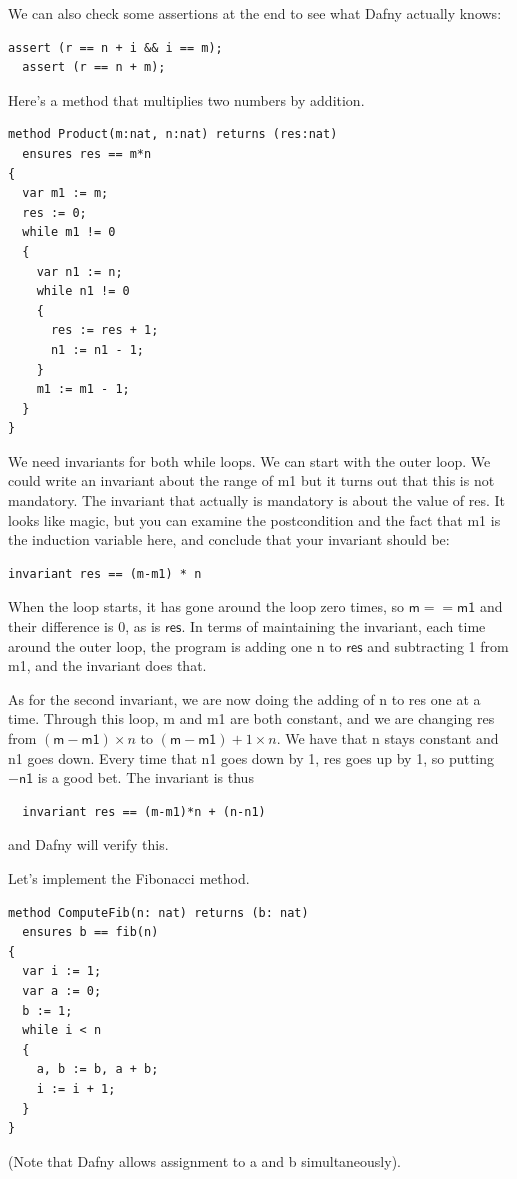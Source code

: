 \documentclass[11pt]{article}
\begin{document}
We can also check some assertions at the end to see what Dafny actually knows:
\begin{lstlisting}[language=dafny]
  assert (r == n + i && i == m);
  assert (r == n + m);
\end{lstlisting}

Here's a method that multiplies two numbers by addition.
\begin{lstlisting}[language=dafny]
method Product(m:nat, n:nat) returns (res:nat)
  ensures res == m*n
{
  var m1 := m;
  res := 0;
  while m1 != 0
  {
    var n1 := n;
    while n1 != 0
    {
      res := res + 1;
      n1 := n1 - 1;
    }
    m1 := m1 - 1;
  }
}
\end{lstlisting}
We need invariants for both \textsf{while} loops. We can start with the outer loop.
We could write an invariant about the range of \textsf{m1} but it turns out that this is not
mandatory. The invariant that actually is mandatory is about the value of \textsf{res}.
It looks like magic, but you can examine the postcondition and the fact that \textsf{m1}
is the induction variable here, and conclude that your invariant should be:
\begin{lstlisting}[language=dafny]
  invariant res == (m-m1) * n
\end{lstlisting}
When the loop starts, it has gone around the loop zero times, so
$\mathsf{m} == \mathsf{m1}$ and their difference is 0, as is
$\mathsf{res}$.  In terms of maintaining the invariant, each time around
the outer loop, the program is adding one \textsf{n} to $\mathsf{res}$
and subtracting 1 from \textsf{m1}, and the invariant does that.

As for the second invariant, we are now doing the adding of \textsf{n} to \textsf{res} one at a time.
Through this loop, \textsf{m} and \textsf{m1} are both constant, and we are changing \textsf{res}
from $(\mathsf{m}-\mathsf{m1}) \times n$ to $(\mathsf{m}-\mathsf{m1}) + 1 \times n$. We have that \textsf{n} stays constant
and \textsf{n1} goes down. Every time that \textsf{n1} goes down by 1, \textsf{res} goes up by 1,
so putting $-\mathsf{n1}$ is a good bet.
The invariant is thus
\begin{lstlisting}
  invariant res == (m-m1)*n + (n-n1)
\end{lstlisting}
and Dafny will verify this.

Let's implement the Fibonacci method.
\begin{lstlisting}[language=dafny]
method ComputeFib(n: nat) returns (b: nat)
  ensures b == fib(n)
{
  var i := 1;
  var a := 0;
  b := 1;
  while i < n
  {
    a, b := b, a + b;
    i := i + 1;
  }
}
\end{lstlisting}
(Note that Dafny allows assignment to \textsf{a} and \textsf{b} simultaneously).
\end{document}
